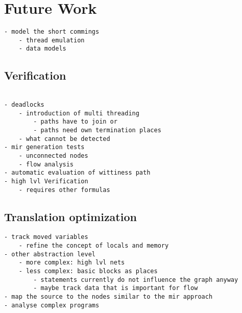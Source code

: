 \chapter{Future Work}
\label{future}
\begin{verbatim}
- model the short commings
    - thread emulation
    - data models
\end{verbatim}

\section{Verification}
\begin{verbatim}
    
- deadlocks
    - introduction of multi threading
        - paths have to join or
        - paths need own termination places
    - what cannot be detected
- mir generation tests
    - unconnected nodes
    - flow analysis
- automatic evaluation of wittiness path 
- high lvl Verification
    - requires other formulas
\end{verbatim}

\section{Translation optimization}
\begin{verbatim}
- track moved variables
    - refine the concept of locals and memory
- other abstraction level
    - more complex: high lvl nets
    - less complex: basic blocks as places
        - statements currently do not influence the graph anyway
        - maybe track data that is important for flow
- map the source to the nodes similar to the mir approach
- analyse complex programs
\end{verbatim}